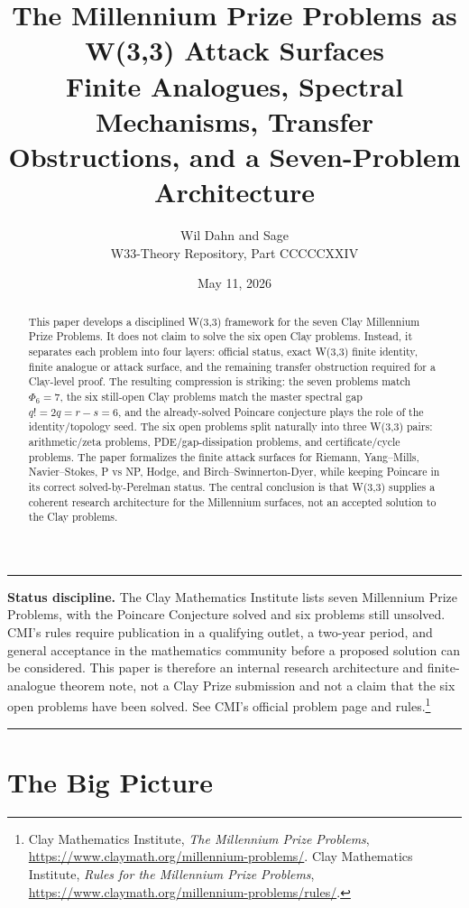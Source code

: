 \documentclass[11pt]{article}
\title{\textbf{The Millennium Prize Problems as W(3,3) Attack Surfaces}\\[0.35em]
\large Finite Analogues, Spectral Mechanisms, Transfer Obstructions, and a Seven-Problem Architecture}
\author{Wil Dahn and Sage\\\small W33-Theory Repository, Part CCCCCXXIV}
\date{May 11, 2026}
\theoremstyle{definition}
\newenvironment{warningbox}{%
  \begin{center}\begin{minipage}{0.94\linewidth}\color{softred}\hrule\vspace{0.65em}
}{%
  \vspace{0.65em}\hrule\end{minipage}\end{center}
}
\begin{document}
\maketitle

\begin{abstract}
This paper develops a disciplined W(3,3) framework for the seven Clay Millennium Prize Problems.  It does not claim to solve the six open Clay problems.  Instead, it separates each problem into four layers: official status, exact W(3,3) finite identity, finite analogue or attack surface, and the remaining transfer obstruction required for a Clay-level proof.  The resulting compression is striking: the seven problems match \(\Phi_6=7\), the six still-open Clay problems match the master spectral gap \(q!=2q=r-s=6\), and the already-solved Poincare conjecture plays the role of the identity/topology seed.  The six open problems split naturally into three W(3,3) pairs: arithmetic/zeta problems, PDE/gap-dissipation problems, and certificate/cycle problems.  The paper formalizes the finite attack surfaces for Riemann, Yang--Mills, Navier--Stokes, P vs NP, Hodge, and Birch--Swinnerton-Dyer, while keeping Poincare in its correct solved-by-Perelman status.  The central conclusion is that W(3,3) supplies a coherent research architecture for the Millennium surfaces, not an accepted solution to the Clay problems.
\end{abstract}

\begin{warningbox}
\textbf{Status discipline.} The Clay Mathematics Institute lists seven Millennium Prize Problems, with the Poincare Conjecture solved and six problems still unsolved.  CMI's rules require publication in a qualifying outlet, a two-year period, and general acceptance in the mathematics community before a proposed solution can be considered.  This paper is therefore an internal research architecture and finite-analogue theorem note, not a Clay Prize submission and not a claim that the six open problems have been solved.  See CMI's official problem page and rules.\footnote{Clay Mathematics Institute, \emph{The Millennium Prize Problems}, \url{https://www.claymath.org/millennium-problems/}.  Clay Mathematics Institute, \emph{Rules for the Millennium Prize Problems}, \url{https://www.claymath.org/millennium-problems/rules/}.}
\end{warningbox}

\tableofcontents
\newpage

\section{The Big Picture}
\end{document}

